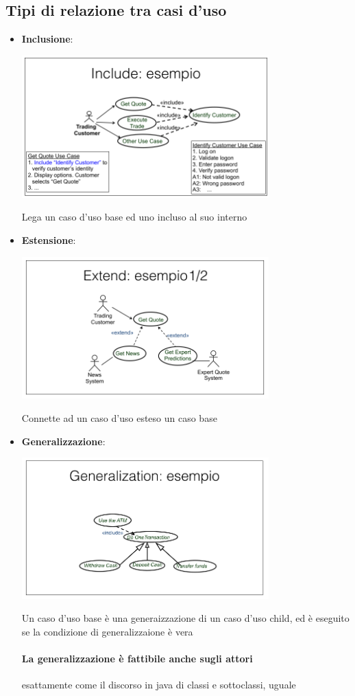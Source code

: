 \documentclass[12pt, a4paper, openany, twoside]{book}
\begin{document}
\subsection{Tipi di relazione tra casi d'uso}
\begin{itemize}
	\item \textbf{Inclusione}:
	\begin{center}
	\includegraphics[width=0.75\textwidth]{4}
	\end{center}
	Lega un caso d'uso base ed uno incluso al suo interno
	\item \textbf{Estensione}:
	\begin{center}
	\includegraphics[width=0.75\textwidth]{5}
	\end{center}
	Connette ad un caso d'uso esteso un caso base
	\item \textbf{Generalizzazione}:
	\begin{center}
	\includegraphics[width=0.75\textwidth]{6}
	\end{center}
	Un caso d'uso base è una generaizzazione di un caso d'uso child, ed è 
	eseguito se la condizione di generalizzaione è vera
	\paragraph{La generalizzazione è fattibile anche sugli attori} esattamente
	come il discorso in java di classi e sottoclassi, uguale
\end{itemize}
\end{document}
